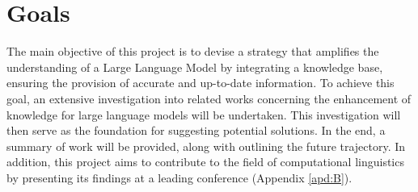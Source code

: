 \section{Goals}
The main objective of this project is to  devise a strategy that amplifies the understanding of a Large Language Model by integrating a  knowledge base, ensuring the provision of accurate and up-to-date information. To achieve this goal, an extensive investigation into related works concerning the enhancement of knowledge for large language models will be undertaken. This investigation will then serve as the foundation for suggesting potential solutions. In the end, a summary of work will be provided, along with outlining the future trajectory. In addition, this project aims to contribute to the field of computational linguistics by presenting its findings at a leading conference (Appendix \ref{apd:B}).
